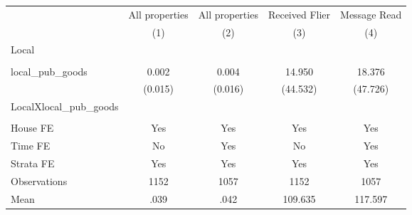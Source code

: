 {
\def\sym#1{\ifmmode^{#1}\else\(^{#1}\)\fi}
\begin{tabular}{l*{4}{c}}
\hline\hline
                &\multicolumn{1}{c}{All properties}&\multicolumn{1}{c}{All properties}&\multicolumn{1}{c}{Received Flier}&\multicolumn{1}{c}{Message Read}\\
                &\multicolumn{1}{c}{(1)}         &\multicolumn{1}{c}{(2)}         &\multicolumn{1}{c}{(3)}         &\multicolumn{1}{c}{(4)}         \\
\hline
Local           &                  &                  &                  &                  \\
                &                  &                  &                  &                  \\
local\_pub\_goods &    0.002         &    0.004         &   14.950         &   18.376         \\
                &  (0.015)         &  (0.016)         & (44.532)         & (47.726)         \\
LocalXlocal\_pub\_goods&                  &                  &                  &                  \\
                &                  &                  &                  &                  \\
House FE        &      Yes         &      Yes         &      Yes         &      Yes         \\
Time FE         &       No         &      Yes         &       No         &      Yes         \\
Strata FE       &      Yes         &      Yes         &      Yes         &      Yes         \\
\hline
Observations    &     1152         &     1057         &     1152         &     1057         \\
Mean            &     .039         &     .042         &  109.635         &  117.597         \\
\hline\hline
\end{tabular}
}
